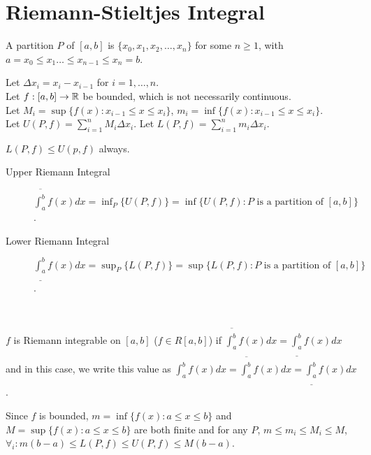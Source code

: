 \chapter{Riemann-Stieltjes Integral}
\begin{definition}[Partition]
	A partition $P$ of $[a,b]$ is $\{x_0,x_1,x_2,\ldots ,x_{n}\}$ for some $n\ge 1$, with $a=x_0\le x_1 \ldots \le x_{n-1}\le x_{n}=b$.\\
\end{definition}
Let $\Delta x_i=x_i-x_{i-1}$ for $i=1,\ldots ,n$.\\
Let $f: [a,b]\to \mathbb{R}$ be bounded, which is not necessarily continuous.\\
Let $M_i=\sup\{f(x):x_{i-1}\le x\le x_i\}$, $m_i=\inf\{f(x):x_{i-1}\le x\le x_i\}$.\\
Let $U(P,f)=\sum_{i=1}^{n}{M_i \Delta x_i}$.
Let $L(P,f)=\sum_{i=1}^{n}{m_{i}\Delta x_{i}}$.\\
\begin{note}
	$L(P,f)\le U(p,f)$ always.
\end{note}

\begin{define}
	\begin{description}
		\item[Upper Riemann Integral] $\overline{\int_{a}^{b}}f(x)dx=\inf_{P}\{ U(P,f)\}=\inf\{U(P,f):P\text{ is a partition of }[a,b]\}$.
		\item[Lower Riemann Integral] $\underline{\int_{a}^{b}}f(x)dx=\sup_{P}\{L(P,f)\} =\sup\{L(P,f):P\text{ is a partition of }[a,b]\}$.
	\end{description}\hfill\\
	\begin{remark}
		$f$ is Riemann integrable on $[a,b]$ ($f \in R[a,b]$) if $\overline{\int_{a}^{b}}f(x)dx=\underline{\int_{a}^{b}}f(x)dx$ and in this case, we write this value as $\int_{a}^{b}f(x)dx=\overline{\int_{a}^{b}}f(x)dx=\underline{\int_{a}^{b}}f(x)dx$.
	\end{remark}
	\begin{note}
		Since $f$ is bounded, $m=\inf\{f(x):a\le x\le b\}$ and $M=\sup\{f(x):a\le x\le b\}$ are both finite and for any $P$, $m\le m_i\le M_i\le M$, $\forall_{i}: m(b-a)\le L(P,f)\le U(P,f)\le M(b-a)$.
	\end{note}
\end{define}


